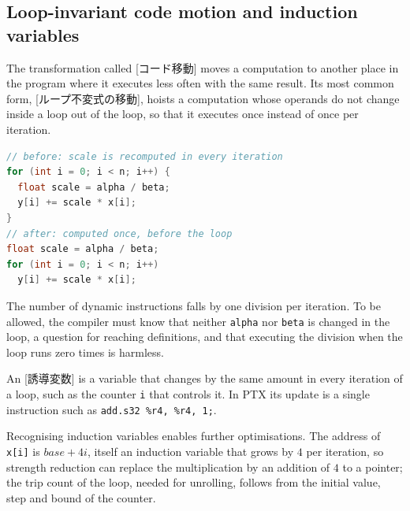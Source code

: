 \documentclass[../main.tex]{subfiles}
\begin{document}
\subsection{Loop-invariant code motion and induction variables}

\begin{definition}
  \label{def:l11-code-motion}
  The transformation called [コード移動] moves a
  computation to another place in
  the program where it executes less often with the same result.  Its
  most common form, [ループ不変式の移動],
  hoists a computation whose operands do not change inside a loop out of
  the loop, so that it executes once instead of once per iteration.
\end{definition}

\begin{lstlisting}[language=C++, numbers=none]
// before: scale is recomputed in every iteration
for (int i = 0; i < n; i++) {
  float scale = alpha / beta;
  y[i] += scale * x[i];
}
// after: computed once, before the loop
float scale = alpha / beta;
for (int i = 0; i < n; i++)
  y[i] += scale * x[i];
\end{lstlisting}

The number of dynamic instructions falls by one division per
iteration.  To be allowed, the compiler must know that neither
\texttt{alpha} nor \texttt{beta} is changed in the loop, a question for
reaching definitions, and that executing the division when the loop
runs zero times is harmless.

\begin{definition}
  \label{def:l11-induction}
  An [誘導変数] is a variable that changes by
  the same amount in every iteration of a loop, such as the counter
  \texttt{i} that controls it.  In PTX its update is a single
  instruction such as \texttt{add.s32 \%r4, \%r4, 1;}.
\end{definition}

Recognising induction variables enables further optimisations.  The
address of \texttt{x[i]} is $\mathit{base} + 4i$, itself an induction
variable that grows by $4$ per iteration, so strength reduction can
replace the multiplication by an addition of $4$ to a pointer; the
trip count of the loop, needed for unrolling, follows from the initial
value, step and bound of the counter.
\end{document}
